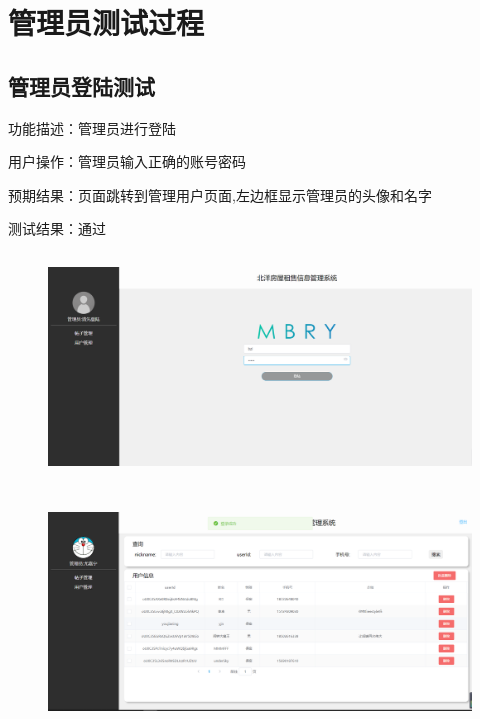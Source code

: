 \chapter{管理员测试过程}

\section{管理员登陆测试}

功能描述：管理员进行登陆
   
用户操作：管理员输入正确的账号密码

预期结果：页面跳转到管理用户页面,左边框显示管理员的头像和名字

测试结果：通过

\begin{figure}[htbp]
    \centering
    \begin{minipage}[t]{0.9\textwidth}
    \centering
    \includegraphics[width=12cm,height=6cm]{test/image/adm1.png} 
    \end{minipage}
    \end{figure}

    \begin{figure}[htbp]
        \centering
        \begin{minipage}[t]{0.9\textwidth}
        \centering
        \includegraphics[width=12cm,height=6cm]{test/image/adm2.png} 
        \end{minipage}
        \end{figure}
\newpage     
